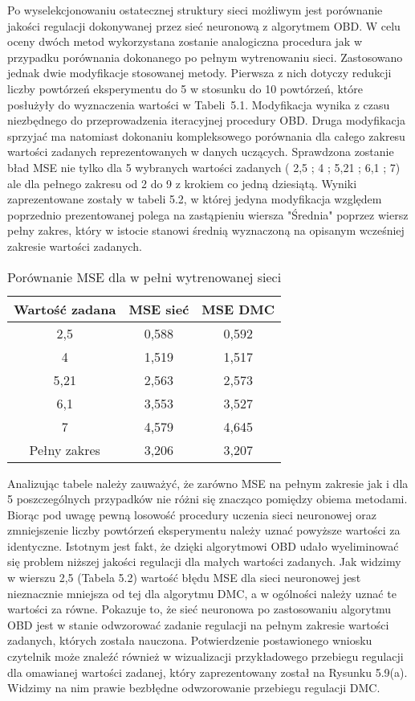 \par Po wyselekcjonowaniu ostatecznej struktury sieci możliwym jest porównanie jakości regulacji dokonywanej przez sieć neuronową z algorytmem OBD. W celu oceny dwóch metod wykorzystana zostanie analogiczna procedura jak w przypadku porównania dokonanego po pełnym wytrenowaniu sieci. Zastosowano jednak dwie modyfikacje stosowanej metody. Pierwsza z nich dotyczy redukcji liczby powtórzeń eksperymentu do 5 w stosunku do 10 powtórzeń, które posłużyły do wyznaczenia wartości w Tabeli~5.1. Modyfikacja wynika z czasu niezbędnego do przeprowadzenia iteracyjnej procedury OBD. Druga modyfikacja sprzyjać ma natomiast dokonaniu kompleksowego porównania dla całego zakresu wartości zadanych reprezentowanych w danych uczących. Sprawdzona zostanie bład MSE nie tylko dla 5 wybranych wartości zadanych ( 2,5 ; 4 ; 5,21 ; 6,1 ; 7) ale dla pełnego zakresu od 2 do 9 z krokiem co jedną dziesiątą. Wyniki zaprezentowane zostały w tabeli 5.2, w której jedyna modyfikacja względem poprzednio prezentowanej polega na zastąpieniu wiersza "Średnia" poprzez wiersz pełny zakres, który w istocie stanowi średnią wyznaczoną na opisanym wcześniej zakresie wartości zadanych.

\begin{table}[!htb] \label{tab:tabela2} \centering
\caption{Porównanie MSE dla w pełni wytrenowanej sieci}
\begin{tabular} {| c | c | c |} \hline
    Wartość zadana & MSE sieć & MSE DMC \\ \hline\hline
    2,5 & 0,588 & 0,592 \\ \hline
    4 & 1,519 & 1,517 \\ \hline
    5,21 & 2,563 & 2,573 \\ \hline
    6,1 & 3,553 & 3,527 \\ \hline
    7 & 4,579 & 4,645 \\ \hline
    Pełny zakres & 3,206  & 3,207 \\ \hline  
\end{tabular}
\end{table}

\par Analizując tabele należy zauważyć, że zarówno MSE na pełnym zakresie jak i dla 5 poszczególnych przypadków nie różni się znacząco pomiędzy obiema metodami. Biorąc pod uwagę pewną losowość procedury uczenia sieci neuronowej oraz zmniejszenie liczby powtórzeń eksperymentu należy uznać powyższe wartości za identyczne. Istotnym jest fakt, że dzięki algorytmowi OBD udało wyeliminować się problem niższej jakości regulacji dla małych wartości zadanych. Jak widzimy w wierszu 2,5 (Tabela 5.2)  wartość błędu MSE dla sieci neuronowej jest nieznacznie mniejsza od tej dla algorytmu DMC, a w ogólności należy uznać te wartości za równe. Pokazuje to, że sieć neuronowa po zastosowaniu algorytmu OBD jest w stanie odwzorować zadanie regulacji na pełnym zakresie wartości zadanych, których została nauczona. Potwierdzenie postawionego wniosku czytelnik może znaleźć również w wizualizacji przykładowego przebiegu regulacji dla omawianej wartości zadanej, który zaprezentowany został na Rysunku 5.9(a). Widzimy na nim prawie bezbłędne odwzorowanie przebiegu regulacji DMC. 

